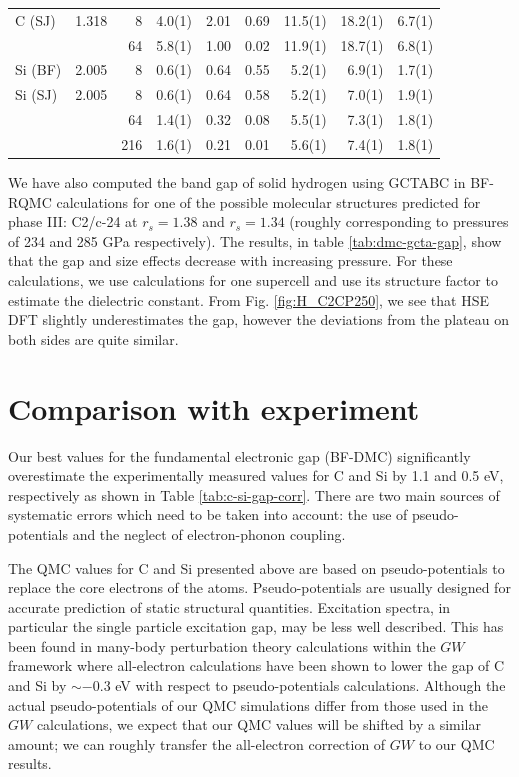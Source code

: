 \begin{table}
\begin{tabular}{lrrrrrrrr}
\hline
C (SJ) & 1.318 &   8 & 4.0(1) & 2.01 & 0.69 & 11.5(1) & 18.2(1) & 6.7(1) \\
  &  &  64 & 5.8(1)   & 1.00 & 0.02 & 11.9(1) & 18.7(1) & 6.8(1) \\
\hline
Si (BF) & 2.005 &   8 & 0.6(1) & 0.64 & 0.55 & 5.2(1) & 6.9(1) & 1.7(1) \\
\hline
Si (SJ) & 2.005 &   8 & 0.6(1) & 0.64 & 0.58 &  5.2(1) &  7.0(1) & 1.9(1) \\
 &  &  64 & 1.4(1)   & 0.32 & 0.08 &  5.5(1) &  7.3(1) & 1.8(1) \\
 &  & 216 & 1.6(1)   & 0.21 & 0.01 &  5.6(1) &  7.4(1) & 1.8(1) \\
\hline
\hline
\end{tabular}
\end{table}

We have also computed the band gap of solid hydrogen using GCTABC in BF-RQMC calculations
for one of the possible
molecular structures predicted for phase III: C2/c-24 at $r_s = 1.38$ and $r_s=1.34$ (roughly corresponding  to pressures of 234 and 285 GPa respectively). The results, in table \ref{tab:dmc-gcta-gap}, show that the gap and size effects decrease with increasing pressure.
For these calculations, we use calculations for one supercell and use its structure factor to estimate the dielectric constant.  From Fig. \ref{fig:H_C2CP250}, we see that
 HSE DFT slightly underestimates the gap, however the deviations from the plateau on both sides are quite similar.

\section{Comparison with experiment}
\label{sec:compare}

Our best values for the fundamental electronic gap (BF-DMC)  significantly overestimate the experimentally measured values for C and Si  by 1.1 and 0.5 eV, respectively as shown in Table \ref{tab:c-si-gap-corr}. There are two main sources of systematic errors which need to be taken into account: the use of pseudo-potentials and the neglect of electron-phonon coupling.

The QMC values for C and Si presented above are based on pseudo-potentials to replace the 
core electrons of the atoms. Pseudo-potentials are usually designed for accurate prediction of
static structural quantities. Excitation spectra, in particular the single particle excitation gap,
may be less well described.
This has been found in many-body perturbation theory calculations within the $GW$ framework
where all-electron calculations have been shown to lower the gap of C and Si by $\sim -0.3$ eV
\cite{Wu02,GomezAbal08}
with respect to  pseudo-potentials calculations.
Although the actual pseudo-potentials of our QMC simulations differ from those used in the
$GW$ calculations, 
we expect that our QMC values will be shifted by a similar amount; we can roughly transfer
the all-electron correction of $GW$ to our QMC results.

